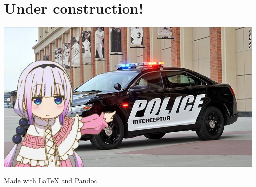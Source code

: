 \documentclass{article}
\begin{document}
\section{Under construction!}

\includegraphics{image.jpg}

Made with \LaTeX{} and Pandoc
\end{document}
